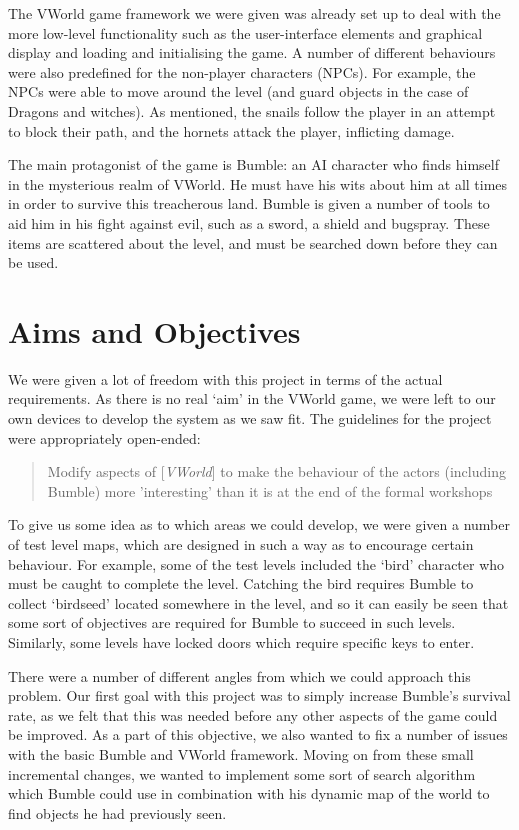 \documentclass[a4paper,oneside]{report}
\begin{document}
The VWorld game framework we were given was already set up to deal with the more low-level functionality such as the user-interface elements and graphical display and loading and initialising the game. A number of different behaviours were also predefined for the non-player characters (NPCs). For example, the NPCs were able to move around the level (and guard objects in the case of Dragons and witches). As mentioned, the snails follow the player in an attempt to block their path, and the hornets attack the player, inflicting damage. 

The main protagonist of the game is Bumble: an AI character who finds himself in the mysterious realm of VWorld. He must have his wits about him at all times in order to survive this treacherous land. Bumble is given a number of tools to aid him in his fight against evil, such as a sword, a shield and bugspray. These items are scattered about the level, and must be searched down before they can be used.

\section{Aims and Objectives}

We were given a lot of freedom with this project in terms of the actual requirements. As there is no real `aim' in the VWorld game, we were left to our own devices to develop the system as we saw fit. The guidelines for the project were appropriately open-ended:

\begin{quotation} 
Modify aspects of [\emph{VWorld}] to make the behaviour of the actors (including Bumble) more 'interesting' than it is at the end of the formal workshops 
\end{quotation}

To give us some idea as to which areas we could develop, we were given a number of test level maps, which are designed in such a way as to encourage certain behaviour. For example, some of the test levels included the `bird' character who must be caught to complete the level. Catching the bird requires Bumble to collect `birdseed' located somewhere in the level, and so it can easily be seen that some sort of objectives are required for Bumble to succeed in such levels. Similarly, some levels have locked doors which require specific keys to enter.

There were a number of different angles from which we could approach this problem. Our first goal with this project was to simply increase Bumble's survival rate, as we felt that this was needed before any other aspects of the game could be improved. As a part of this objective, we also wanted to fix a number of issues with the basic Bumble and VWorld framework. Moving on from these small incremental changes, we wanted to implement some sort of search algorithm which Bumble could use in combination with his dynamic map of the world to find objects he had previously seen.
\end{document}
